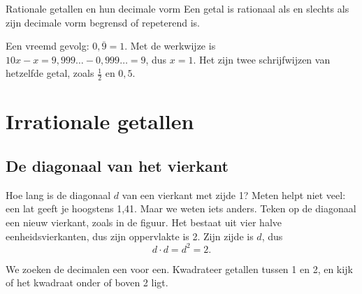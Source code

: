 \begin{theorie}
\begin{stelling}{Rationale getallen en hun decimale vorm}
Een getal is rationaal als en slechts als zijn decimale vorm begrensd of repeterend is.
\end{stelling}
\end{theorie}

Een vreemd gevolg: $0,\overline{9} = 1$. Met de werkwijze is $10x - x = 9,999\ldots - 0,999\ldots = 9$, dus $x = 1$. Het zijn twee schrijfwijzen van hetzelfde getal, zoals $\tfrac12$ en $0,5$.

\section{Irrationale getallen}

\subsection{De diagonaal van het vierkant}

Hoe lang is de diagonaal $d$ van een vierkant met zijde 1? Meten helpt niet veel: een lat geeft je hoogstens 1,41. Maar we weten iets anders. Teken op de diagonaal een nieuw vierkant, zoals in de figuur. Het bestaat uit vier halve eenheidsvierkanten, dus zijn oppervlakte is 2. Zijn zijde is $d$, dus
\[ d \cdot d = d^2 = 2 . \]


We zoeken de decimalen een voor een. Kwadrateer getallen tussen 1 en 2, en kijk of het kwadraat onder of boven 2 ligt.

